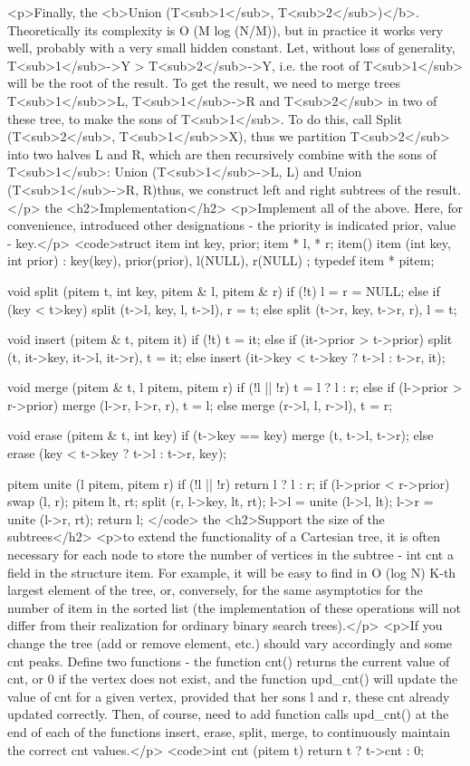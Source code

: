 <p>Finally, the <b>Union (T<sub>1</sub>, T<sub>2</sub>)</b>. Theoretically its complexity is O (M log (N/M)), but in practice it works very well, probably with a very small hidden constant. Let, without loss of generality, T<sub>1</sub>->Y > T<sub>2</sub>->Y, i.e. the root of T<sub>1</sub> will be the root of the result. To get the result, we need to merge trees T<sub>1</sub>>L, T<sub>1</sub>->R and T<sub>2</sub> in two of these tree, to make the sons of T<sub>1</sub>. To do this, call Split (T<sub>2</sub>, T<sub>1</sub>>X), thus we partition T<sub>2</sub> into two halves L and R, which are then recursively combine with the sons of T<sub>1</sub>: Union (T<sub>1</sub>->L, L) and Union (T<sub>1</sub>->R, R)thus, we construct left and right subtrees of the result.</p>
the <h2>Implementation</h2>
<p>Implement all of the above. Here, for convenience, introduced other designations - the priority is indicated prior, value - key.</p>
<code>struct item {
int key, prior;
item * l, * r;
item() { }
item (int key, int prior) : key(key), prior(prior), l(NULL), r(NULL) { }
};
typedef item * pitem;

void split (pitem t, int key, pitem & l, pitem & r) {
if (!t)
l = r = NULL;
else if (key < t>key)
split (t->l, key, l, t->l), r = t;
else
split (t->r, key, t->r, r), l = t;
}

void insert (pitem & t, pitem it) {
if (!t)
t = it;
else if (it->prior > t->prior)
split (t, it->key, it->l, it->r), t = it;
else
insert (it->key < t->key ? t->l : t->r, it);
}

void merge (pitem & t, l pitem, pitem r) {
if (!l || !r)
t = l ? l : r;
else if (l->prior > r->prior)
merge (l->r, l->r, r), t = l;
else
merge (r->l, l, r->l), t = r;
}

void erase (pitem & t, int key) {
if (t->key == key)
merge (t, t->l, t->r);
else
erase (key < t->key ? t->l : t->r, key);
}

pitem unite (l pitem, pitem r) {
if (!l || !r) return l ? l : r;
if (l->prior < r->prior) swap (l, r);
pitem lt, rt;
split (r, l->key, lt, rt);
l->l = unite (l->l, lt);
l->r = unite (l->r, rt);
return l;
}</code>
the <h2>Support the size of the subtrees</h2>
<p>to extend the functionality of a Cartesian tree, it is often necessary for each node to store the number of vertices in the subtree - int cnt a field in the structure item. For example, it will be easy to find in O (log N) K-th largest element of the tree, or, conversely, for the same asymptotics for the number of item in the sorted list (the implementation of these operations will not differ from their realization for ordinary binary search trees).</p>
<p>If you change the tree (add or remove element, etc.) should vary accordingly and some cnt peaks. Define two functions - the function cnt() returns the current value of cnt, or 0 if the vertex does not exist, and the function upd_cnt() will update the value of cnt for a given vertex, provided that her sons l and r, these cnt already updated correctly. Then, of course, need to add function calls upd_cnt() at the end of each of the functions insert, erase, split, merge, to continuously maintain the correct cnt values.</p>
<code>int cnt (pitem t) {
return t ? t->cnt : 0;
}

